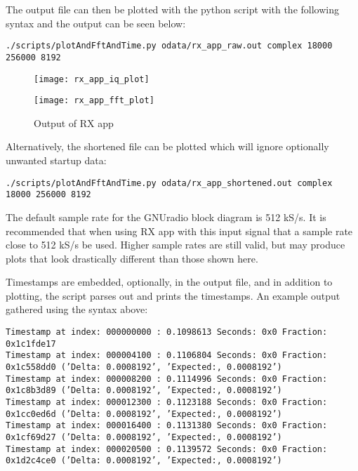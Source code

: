 \par\medskip
\noindent The output file can then be plotted with the python script with the following syntax and the output can be seen below:\par\medskip
\noindent\texttt{./scripts/plotAndFftAndTime.py odata/rx\_app\_raw.out complex 18000 256000 8192}\par
	\begin{figure}[h]
	 	\centering
		\texttt{[image: rx\_app\_iq\_plot]}
		\label{fig:rx_app_iq_plot}
	\end{figure}
	\begin{figure}[h]
	 	\centering
		\texttt{[image: rx\_app\_fft\_plot]}
		\caption{Output of RX app}
		\label{fig:rx_app_fft_plot}
	\end{figure}
\noindent Alternatively, the shortened file can be plotted which will ignore optionally unwanted startup data:\par\medskip
\noindent\texttt{./scripts/plotAndFftAndTime.py odata/rx\_app\_shortened.out complex 18000 256000 8192}\par\medskip
\noindent The default sample rate for the GNUradio block diagram is 512 kS/s. It is recommended that when using RX app with this input signal that a sample rate close to 512 kS/s be used. Higher sample rates are still valid, but may produce plots that look drastically different than those shown here.\par\medskip
\newpage
\noindent Timestamps are embedded, optionally, in the output file, and in addition to plotting, the script parses out and prints the timestamps. An example output gathered using the syntax above:\par\medskip
\scriptsize\noindent\texttt{Timestamp at index: 000000000 :  0.1098613 Seconds: 0x0 Fraction: 0x1c1fde17 \\ 
Timestamp at index: 000004100 :  0.1106804 Seconds: 0x0 Fraction: 0x1c558dd0 ('Delta: 0.0008192', 'Expected:, 0.0008192') \\
Timestamp at index: 000008200 :  0.1114996 Seconds: 0x0 Fraction: 0x1c8b3d89 ('Delta: 0.0008192', 'Expected:, 0.0008192') \\
Timestamp at index: 000012300 :  0.1123188 Seconds: 0x0 Fraction: 0x1cc0ed6d ('Delta: 0.0008192', 'Expected:, 0.0008192') \\
Timestamp at index: 000016400 :  0.1131380 Seconds: 0x0 Fraction: 0x1cf69d27 ('Delta: 0.0008192', 'Expected:, 0.0008192') \\
Timestamp at index: 000020500 :  0.1139572 Seconds: 0x0 Fraction: 0x1d2c4ce0 ('Delta: 0.0008192', 'Expected:, 0.0008192')}\par\medskip

